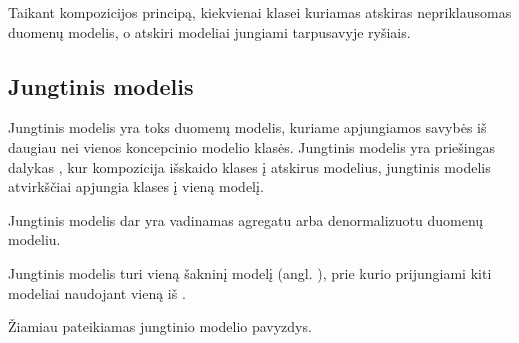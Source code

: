 \documentclass[letterpaper,10pt,lithuanian]{sphinxmanual}
\begin{document}
\sphinxAtStartPar
Taikant kompozicijos principą, kiekvienai klasei kuriamas atskiras
nepriklausomas duomenų modelis, o atskiri modeliai jungiami tarpusavyje
ryšiais.


\subsection{Jungtinis modelis}
\label{\detokenize{identifikatoriai:jungtinis-modelis}}\label{\detokenize{identifikatoriai:ref-denorm}}
\sphinxAtStartPar
Jungtinis modelis yra toks duomenų modelis, kuriame apjungiamos savybės iš
daugiau nei vienos koncepcinio modelio klasės. Jungtinis modelis yra priešingas
dalykas {\hyperref[\detokenize{identifikatoriai:composition}]{}}, kur kompozicija išskaido klases į
atskirus modelius, jungtinis modelis atvirkščiai apjungia klases į vieną
modelį.

\sphinxAtStartPar
Jungtinis modelis dar yra vadinamas agregatu arba denormalizuotu duomenų
modeliu.

\sphinxAtStartPar
Jungtinis modelis turi vieną šakninį modelį (angl. ), prie
kurio prijungiami kiti modeliai naudojant vieną iš {\hyperref[\detokenize{identifikatoriai:ref-types}]{}}.

\sphinxAtStartPar
Žiamiau pateikiamas jungtinio modelio pavyzdys.
\end{document}
